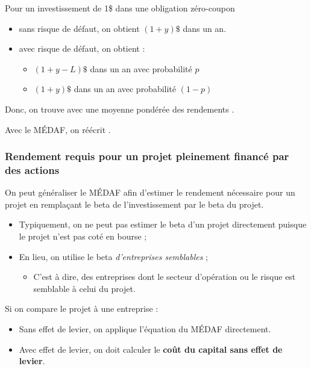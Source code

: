\documentclass[10pt, french]{article}
\begin{document}
\begin{multicols*}{2}
\begin{definitionNOHFILLsub}
Pour un investissement de 1\$ dans une obligation zéro-coupon
\begin{itemize}
	\item	sans risque de défaut, on obtient $(1 + y)\$$ dans un an.
	\item	avec risque de défaut, on obtient :
		\begin{itemize}
		\item	$(1 + y - L)\$$ dans un an avec probabilité $p$
		\item	$(1 + y)\$$ dans un an avec probabilité $(1 - p)$
		\end{itemize}
\end{itemize}

Donc, on trouve avec une moyenne pondérée des rendements .
\end{definitionNOHFILLsub}

\begin{definitionNOHFILLprop}
Avec le MÉDAF, on réécrit .\\
\end{definitionNOHFILLprop}


\columnbreak
\subsubsection{Rendement requis pour un projet pleinement financé par des actions}
\label{sec:wacc_def}
On peut généraliser le MÉDAF afin d'estimer le rendement nécessaire pour un projet en remplaçant le beta de l'investissement par le beta du projet.

\begin{itemize}
	\item	Typiquement, on ne peut pas estimer le beta d'un projet directement puisque le projet n'est pas coté en bourse ;
	\item	En lieu, on utilise le beta \textit{d'entreprises semblables} ;
		\begin{itemize}
		\item	C'est à dire, des entreprises dont le secteur d'opération ou le risque est semblable à celui du projet.
		\end{itemize}
\end{itemize}

Si on compare le projet à une entreprise :
\begin{itemize}
	\item	Sans effet de levier, on applique l'équation du MÉDAF directement.
	\item	Avec effet de levier, on doit calculer le \textbf{coût du capital sans effet de levier}.
\end{itemize}


\end{multicols*}
\end{document}
